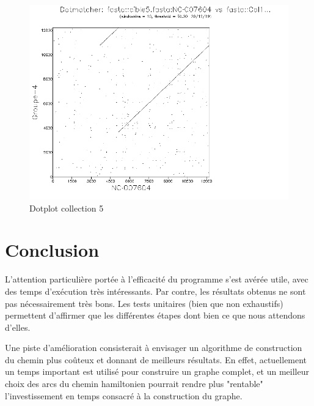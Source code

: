 \documentclass{article}
\begin{document}
\begin{figure}[h]
\includegraphics[width=\textwidth]{col16320.png}
	\caption{Dotplot collection 5}
	\label{dotplot}
\centering
\end{figure}

\section{Conclusion}

L'attention particulière portée à l'efficacité du programme s'est avérée utile, avec des temps d'exécution très intéressants. Par contre, les résultats obtenus ne sont pas nécessairement très bons. Les tests unitaires (bien que non exhaustifs) permettent d'affirmer que les différentes étapes dont bien ce que nous attendons d'elles.

Une piste d'amélioration consisterait à envisager un algorithme de construction du chemin plus coûteux et donnant de meilleurs résultats. En effet, actuellement un temps important est utilisé pour construire un graphe complet, et un meilleur choix des arcs du chemin hamiltonien pourrait rendre plus "rentable" l'investissement en temps consacré à la construction du graphe.
\end{document}
